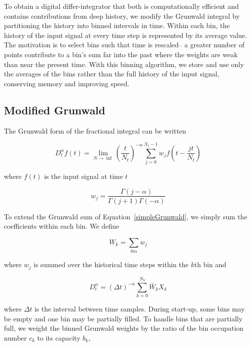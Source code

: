 


To obtain a digital differ-integrator that both is computationally efficient and contains contributions from deep history, we modify the Grunwald integral by partitioning the history into binned intervals in time. Within each bin, the history of the input signal at every time step is represented by its average value. The motivation is to select bins such that time is rescaled-- a greater number of points contribute to a bin's sum far into the past where the weights are weak than near the present time.  With this binning algorithm, we store and use only the averages of the bins rather than the full history of the input signal, conserving memory and improving speed.

\subsection{Modified Grunwald}

The Grunwald form of the fractional integral can be written

\begin{equation}
D^\alpha_tf(t) = \displaystyle \lim_{N\rightarrow\inf} \left(\frac{t}{N_t}\right)^{-\alpha}
\displaystyle\sum\limits_{j=0}^{N_t-1} w_{j} f\left(t-\frac{j t}{N_t}\right)
\label{simpleGrunwald}
\end{equation}

\noindent where $f(t)$ is the input signal at time $t$

\begin{equation}
w_{j} = \frac{\Gamma(j-\alpha)}{\Gamma(j+1)\Gamma(-\alpha)}
\label{wj}
\end{equation}

\noindent To extend the Grunwald sum of Equation~\ref{simpleGrunwald}, we simply
sum the coefficients within each bin. We define

\begin{equation}
W_k = \displaystyle\sum\limits_{bin} w_j
\label{sumWk}
\end{equation}

\noindent where $w_j$ is summed over the historical time steps within the $k$th bin and

\begin{equation}
D^\alpha_t = \displaystyle(\Delta t)^{-\alpha}\sum\limits_{k=0}^{N_b}\bar{W}_kX_k
\label{avgSimpleGrunwald}
\end{equation}

\noindent where $\Delta t$ is the interval between time samples. During start-up, some bins may be empty and one bin may be partially filled. To handle bins that are partially full, we weight the binned Grunwald weights by the ratio of the bin occupation number $c_k$ to its capacity $b_k$, 

